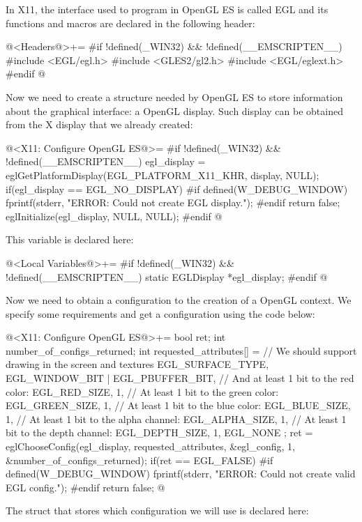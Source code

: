 
In X11, the interface used to program in OpenGL ES is called EGL and
its functions and macros are declared in the following header:

\iniciocodigo
@<Headers@>+=
#if !defined(_WIN32) && !defined(__EMSCRIPTEN__)
#include <EGL/egl.h>
#include <GLES2/gl2.h>
#include <EGL/eglext.h>
#endif
@
\fimcodigo

Now we need to create a structure needed by OpenGL ES to store
information about the graphical interface: a OpenGL display. Such
display can be obtained from the X display that we already created:

\iniciocodigo
@<X11: Configure OpenGL ES@>=
#if !defined(_WIN32) && !defined(__EMSCRIPTEN__)
egl_display = eglGetPlatformDisplay(EGL_PLATFORM_X11_KHR, display,
                                    NULL);
if(egl_display == EGL_NO_DISPLAY){
#if defined(W_DEBUG_WINDOW)
  fprintf(stderr, "ERROR: Could not create EGL display.\n");
#endif
  return false;
}
eglInitialize(egl_display, NULL, NULL);
#endif
@
\fimcodigo

This variable is declared here:

\iniciocodigo
@<Local Variables@>+=
#if !defined(_WIN32) && !defined(__EMSCRIPTEN__)
static EGLDisplay *egl_display;
#endif
@
\fimcodigo

Now we need to obtain a configuration to the creation of a OpenGL
context. We specify some requirements and get a configuration using
the code below:

\iniciocodigo
@<X11: Configure OpenGL ES@>+=
{
  bool ret;
  int number_of_configs_returned;
  int requested_attributes[] = {
    // We should support drawing in the screen and textures
    EGL_SURFACE_TYPE,  EGL_WINDOW_BIT | EGL_PBUFFER_BIT,
    // And at least 1 bit to the red color:
    EGL_RED_SIZE, 1,
    // At least 1 bit to the green color:
    EGL_GREEN_SIZE, 1,
    // At least 1 bit to the blue color:
    EGL_BLUE_SIZE, 1,
    // At least 1 bit to the alpha channel:
    EGL_ALPHA_SIZE, 1,
    // At least 1 bit to the depth channel:
    EGL_DEPTH_SIZE, 1,
    EGL_NONE
  };
  ret = eglChooseConfig(egl_display, requested_attributes,
                        &egl_config, 1, &number_of_configs_returned);
  if(ret == EGL_FALSE){
#if defined(W_DEBUG_WINDOW)
    fprintf(stderr, "ERROR: Could not create valid EGL config.\n");
#endif
    return false;
  }
}
@
\fimcodigo

The struct that stores which configuration we will use is declared
here:

